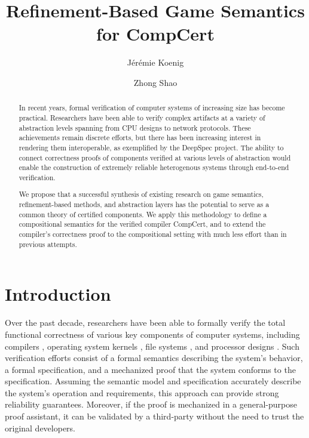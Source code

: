 \documentclass[sigplan,10pt,review,anonymous]{acmart}
\title{Refinement-Based Game Semantics for CompCert}
\author{J\'er\'emie Koenig}
\affiliation{Yale University}
\author{Zhong Shao}
\affiliation{Yale University}
\begin{document}
\begin{abstract} %
In recent years,
formal verification of computer systems
of increasing size has become practical.
Researchers have been able to verify complex artifacts
at a variety of abstraction levels spanning
from CPU designs to network protocols.
These achievements remain discrete efforts, but
there has been increasing interest in rendering them interoperable,
as exemplified by the DeepSpec project.
The ability to connect correctness proofs of components
verified at various levels of abstraction
would enable the construction of extremely reliable heterogenous systems
through end-to-end verification.

We propose that a successful synthesis of existing research on
game semantics,
refinement-based methods, and
abstraction layers
has the potential to serve as a common theory
of certified components.
We apply this methodology to define
a compositional semantics for the verified compiler
CompCert,
and to extend
the compiler's correctness proof
to the compositional setting
with much less effort than in previous attempts.
\end{abstract}

\maketitle

\section{Introduction} %


Over the past decade,
researchers have been able to formally verify the
total functional correctness
of various key components of computer systems,
including
compilers \cite{compcert, vellvm},
operating system kernels \cite{sel4, popl15},
file systems \cite{fscq}, and
processor designs \cite{safe}.
Such verification efforts
consist of
a formal semantics describing the system's behavior,
a formal specification,
and a mechanized proof that
the system conforms to the specification.
Assuming the semantic model and specification accurately describe
the system's operation and requirements,
this approach can provide
strong reliability guarantees.
Moreover,
if the proof is mechanized in a general-purpose proof assistant,
it can be validated by a third-party
without the need to trust the original developers.

\end{document}
